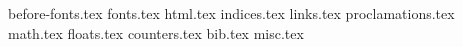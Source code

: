 {before-fonts.tex}
{fonts.tex}
{html.tex}
{indices.tex}
{links.tex}
{proclamations.tex}
{math.tex}
{floats.tex}
{counters.tex}
{bib.tex}
{misc.tex}
